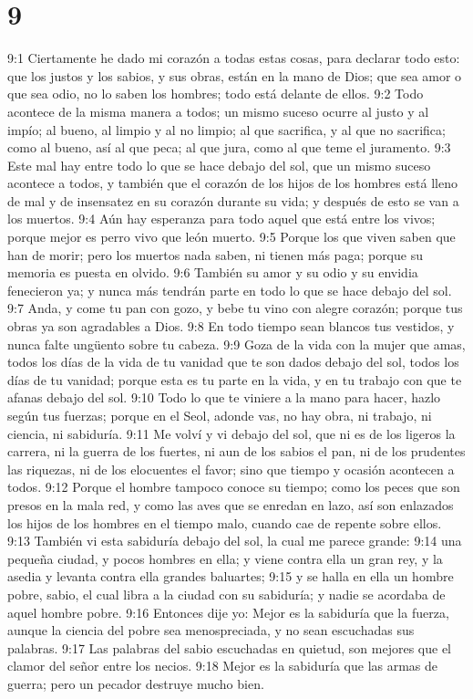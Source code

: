 \chapter{9}

9:1 Ciertamente he dado mi corazón a todas estas cosas, para declarar todo esto: que los justos y los sabios, y sus obras, están en la mano de Dios; que sea amor o que sea odio, no lo saben los hombres; todo está delante de ellos.  
9:2 Todo acontece de la misma manera a todos; un mismo suceso ocurre al justo y al impío; al bueno, al limpio y al no limpio; al que sacrifica, y al que no sacrifica; como al bueno, así al que peca; al que jura, como al que teme el juramento.  
9:3 Este mal hay entre todo lo que se hace debajo del sol, que un mismo suceso acontece a todos, y también que el corazón de los hijos de los hombres está lleno de mal y de insensatez en su corazón durante su vida; y después de esto se van a los muertos.  
9:4 Aún hay esperanza para todo aquel que está entre los vivos; porque mejor es perro vivo que león muerto.  
9:5 Porque los que viven saben que han de morir; pero los muertos nada saben, ni tienen más paga; porque su memoria es puesta en olvido.  
9:6 También su amor y su odio y su envidia fenecieron ya; y nunca más tendrán parte en todo lo que se hace debajo del sol.  
9:7 Anda, y come tu pan con gozo, y bebe tu vino con alegre corazón; porque tus obras ya son agradables a Dios.  
9:8 En todo tiempo sean blancos tus vestidos, y nunca falte ungüento sobre tu cabeza.  
9:9 Goza de la vida con la mujer que amas, todos los días de la vida de tu vanidad que te son dados debajo del sol, todos los días de tu vanidad; porque esta es tu parte en la vida, y en tu trabajo con que te afanas debajo del sol.  
9:10 Todo lo que te viniere a la mano para hacer, hazlo según tus fuerzas; porque en el Seol, adonde vas, no hay obra, ni trabajo, ni ciencia, ni sabiduría.  
9:11 Me volví y vi debajo del sol, que ni es de los ligeros la carrera, ni la guerra de los fuertes, ni aun de los sabios el pan, ni de los prudentes las riquezas, ni de los elocuentes el favor; sino que tiempo y ocasión acontecen a todos.  
9:12 Porque el hombre tampoco conoce su tiempo; como los peces que son presos en la mala red, y como las aves que se enredan en lazo, así son enlazados los hijos de los hombres en el tiempo malo, cuando cae de repente sobre ellos.  
9:13 También vi esta sabiduría debajo del sol, la cual me parece grande:  
9:14 una pequeña ciudad, y pocos hombres en ella; y viene contra ella un gran rey, y la asedia y levanta contra ella grandes baluartes;  
9:15 y se halla en ella un hombre pobre, sabio, el cual libra a la ciudad con su sabiduría; y nadie se acordaba de aquel hombre pobre.  
9:16 Entonces dije yo: Mejor es la sabiduría que la fuerza, aunque la ciencia del pobre sea menospreciada, y no sean escuchadas sus palabras.  
9:17 Las palabras del sabio escuchadas en quietud, son mejores que el clamor del señor entre los necios.  
9:18 Mejor es la sabiduría que las armas de guerra; pero un pecador destruye mucho bien.  

